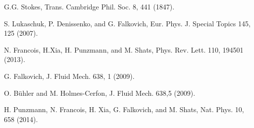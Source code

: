 \begin{thebibliography}{99}
G.G. Stokes, Trans. Cambridge Phil. Soc. 8, 441 (1847).



S. Lukaschuk, P. Denissenko, and G. Falkovich, Eur. Phys. J. Special Topics 145, 125 (2007).





N. Francois, H.Xia, H. Punzmann, and M. Shats, Phys. Rev. Lett. 110, 194501 (2013).





G. Falkovich, J. Fluid Mech. 638, 1 (2009).

O. Bühler and M. Holmes-Cerfon, J. Fluid Mech. 638,5 (2009).

H. Punzmann, N. Francois, H. Xia, G. Falkovich, and M. Shats, Nat. Phys. 10, 658 (2014).






\end{thebibliography}
